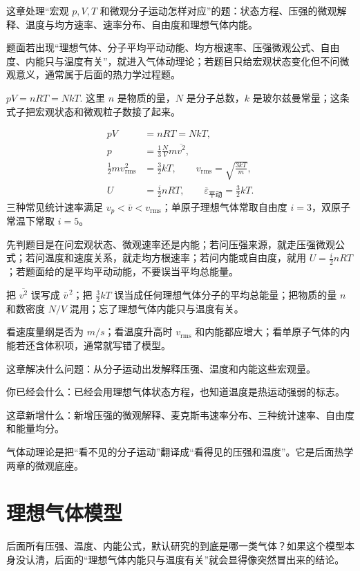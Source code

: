 \documentclass[lang=cn,11pt]{elegantbook}
\newcommand{\bridge}[1]{\begin{note}#1\end{note}}
\newcommand{\chapterroadmap}[3]{%
\begin{introduction}
 \item {\heiti 这章解决什么问题：}#1
 \item {\heiti 你已经会什么：}#2
 \item {\heiti 这章新增什么：}#3
\end{introduction}}
\begin{document}
\begin{skill}[第10章冲刺总手册]\label{sk:phys-ch10-overview}
 这章处理“宏观 \(p,V,T\) 和微观分子运动怎样对应”的题：状态方程、压强的微观解释、温度与均方速率、速率分布、自由度和理想气体内能。

 题面若出现“理想气体、分子平均平动动能、均方根速率、压强微观公式、自由度、内能只与温度有关”，就进入气体动理论；若题目只给宏观状态变化但不问微观意义，通常属于后面的热力学过程题。


 \(pV=nRT=NkT.\) 
这里 \(n\) 是物质的量，\(N\) 是分子总数，\(k\) 是玻尔兹曼常量；这条式子把宏观状态和微观粒子数接了起来。


\[
\begin{aligned}
pV&=nRT=NkT,\\
p&=\frac13\frac{N}{V}m\overline{v^2},\\
\frac12 m v_{\mathrm{rms}}^2&=\frac32 kT,\qquad
v_{\mathrm{rms}}=\sqrt{\frac{3kT}{m}},\\
U&=\frac{i}{2}nRT,\qquad
\overline{\varepsilon}_{\text{平动}}=\frac32 kT.
\end{aligned}
\]
三种常见统计速率满足 \(v_p<\bar v<v_{\mathrm{rms}}\)；单原子理想气体常取自由度 \(i=3\)，双原子常温下常取 \(i=5\)。

 先判题目是在问宏观状态、微观速率还是内能；若问压强来源，就走压强微观公式；若问温度和速度关系，就走均方根速率；若问内能或自由度，就用 \(U=\frac{i}{2}nRT\)；若题面给的是平均平动动能，不要误当平均总能量。

 把 \(\overline{v^2}\) 误写成 \(\bar v^{\,2}\)；把 \(\frac32kT\) 误当成任何理想气体分子的平均总能量；把物质的量 \(n\) 和数密度 \(N/V\) 混用；忘了理想气体内能只与温度有关。

 看速度量纲是否为 \(\si{m/s}\)；看温度升高时 \(v_{\mathrm{rms}}\) 和内能都应增大；看单原子气体的内能若还含体积项，通常就写错了模型。
\end{skill}

\chapterroadmap
{从分子运动出发解释压强、温度和内能这些宏观量。}
{已经会用理想气体状态方程，也知道温度是热运动强弱的标志。}
{新增压强的微观解释、麦克斯韦速率分布、三种统计速率、自由度和能量均分。}

\bridge{气体动理论是把“看不见的分子运动”翻译成“看得见的压强和温度”。它是后面热学两章的微观底座。}

\section{理想气体模型}

 后面所有压强、温度、内能公式，默认研究的到底是哪一类气体？如果这个模型本身没认清，后面的“理想气体内能只与温度有关”就会显得像突然冒出来的结论。
\end{document}
